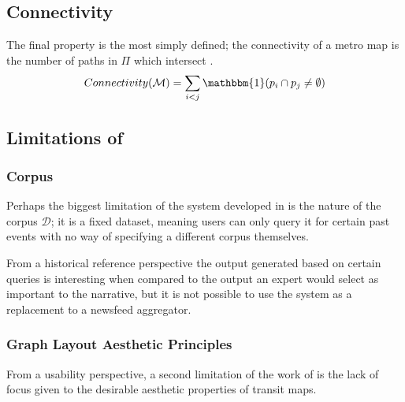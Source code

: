 \subsection{Connectivity}
The final property is the most simply defined; the connectivity of a metro map is the number of paths in $\Pi$ which intersect \citep{GeneratingInformationMaps}.
\begin{equation}
	Connectivity(\mathcal{M}) = \sum_{i<j}\mathbbm{1}(p_i \cap p_j \neq\emptyset)
\end{equation}

\subsection{Limitations of \citep{GeneratingInformationMaps, InformationCartographyPre}}

\subsubsection{Corpus}
Perhaps the biggest limitation of the system developed in \citep{GeneratingInformationMaps, InformationCartographyPre} is the nature of the corpus $\mathcal{D}$; it is a fixed dataset, meaning users can only query it for certain past events with no way of specifying a different corpus themselves.

From a historical reference perspective the output generated based on certain queries is interesting when compared to the output an expert would select as important to the narrative, but it is not possible to use the system as a replacement to a newsfeed aggregator.

\subsubsection{Graph Layout Aesthetic Principles}

From a usability perspective, a second limitation of the work of \citeauthor{GeneratingInformationMaps} is the lack of focus given to the desirable aesthetic properties of transit maps.

